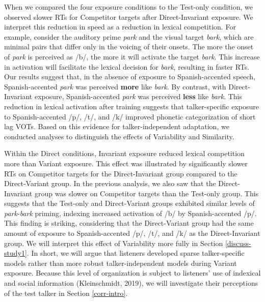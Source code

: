 \documentclass[
  12pt,
  twoside]{article}
\begin{document}
When we compared the four exposure conditions to the Test-only condition, we observed slower RTs for Competitor targets after Direct-Invariant exposure.
We interpret this reduction in speed as a reduction in lexical competition.
For example, consider the auditory prime \emph{park} and the visual target \emph{bark}, which are minimal pairs that differ only in the voicing of their onsets.
The more the onset of \emph{park} is perceived as /b/, the more it will activate the target \emph{bark}.
This increase in activation will facilitate the lexical decision for \emph{bark}, resulting in faster RTs.
Our results suggest that, in the absence of exposure to Spanish-accented speech, Spanish-accented \emph{park} was perceived \textbf{more} like \emph{bark}.
By contrast, with Direct-Invariant exposure, Spanish-accented \emph{park} was perceived \textbf{less} like \emph{bark}.
This reduction in lexical activation after training suggests that talker-specific exposure to Spanish-accented /p/, /t/, and /k/ improved phonetic categorization of short lag VOTs.
Based on this evidence for talker-independent adaptation, we conducted analyses to distinguish the effects of Variability and Similarity.

Within the Direct conditions, Invariant exposure reduced lexical competition more than Variant exposure.
This effect was illustrated by significantly slower RTs on Competitor targets for the Direct-Invariant group compared to the Direct-Variant group.
In the previous analysis, we also saw that the Direct-Invariant group was slower on Competitor targets than the Test-only group.
This suggests that the Test-only and Direct-Variant groups exhibited similar levels of \emph{park}-\emph{bark} priming, indexing increased activation of /b/ by Spanish-accented /p/.
This finding is striking, considering that the Direct-Variant group had the same amount of exposure to Spanish-accented /p/, /t/, and /k/ as the Direct-Invariant group.
We will interpret this effect of Variability more fully in Section \ref{discuss-study1}.
In short, we will argue that listeners developed sparse talker-specific models rather than more robust talker-independent models during Variant exposure.
Because this level of organization is subject to listeners' use of indexical and social information (Kleinschmidt, 2019), we will investigate their perceptions of the test talker in Section \ref{corr-intro}.
\end{document}

